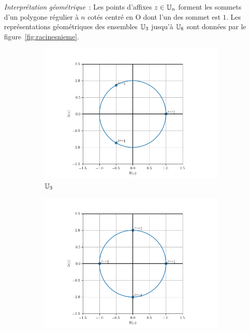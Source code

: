 \emph{Interprétation géométrique}~: Les points d'affixes \(z \in{}\mathbb{U}_n\) forment 
les sommets d'un polygone régulier à \(n\) cotés centré en O dont l'un des 
sommet est \(1\). Les représentations géométriques des ensembles \(\mathbb{U}_3\) 
jusqu'à \(\mathbb{U}_{8}\) sont données par le figure~\ref{fig:racinesnieme}.

\begin{figure}
  \begin{subfigure}{.3\textwidth}
    \centering
    \includegraphics[scale = 0.33]{U_3.png}  
    \caption{$\mathbb{U}_3$}
    \label{fig:U3}
  \end{subfigure}
  \begin{subfigure}{.3\textwidth}
    \centering
    \includegraphics[scale = 0.33]{U_4.png}  

\end{subfigure}
\end{figure}
